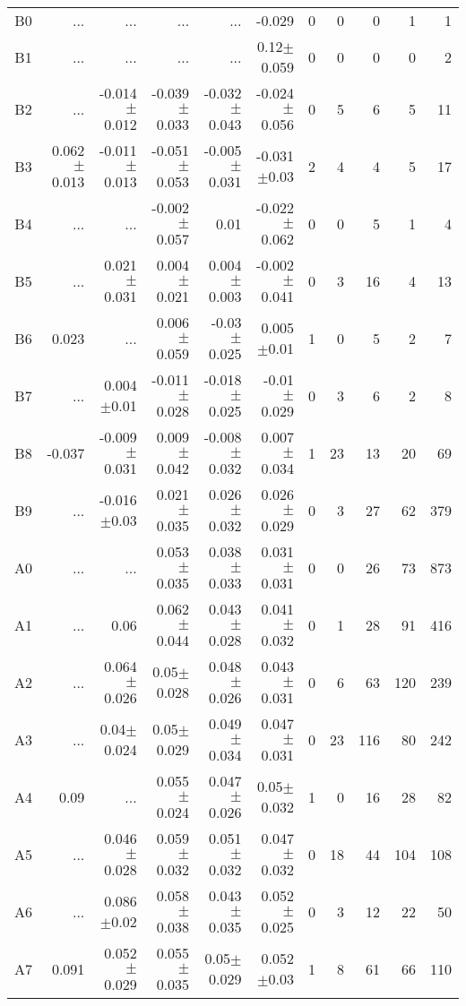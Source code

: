 \begin{table}[t]
\begin{table}[t]
\begin{center}
\begin{tabular}{c|rrrrr|rrrrr}
    B0	&	 ...	&	 ...	&	 ...	&	 ...	&	-0.029	&	0	&	0	&	0	&	1	&	1	\\
    B1	&	 ...	&	 ...	&	 ...	&	 ...	&	0.12$\pm$0.059	&	0	&	0	&	0	&	0	&	2	\\
    B2	&	 ...	&	-0.014$\pm$0.012	&	-0.039$\pm$0.033	&	-0.032$\pm$0.043	&	-0.024$\pm$0.056	&	0	&	5	&	6	&	5	&	11	\\
    B3	&	0.062$\pm$0.013	&	-0.011$\pm$0.013	&	-0.051$\pm$0.053	&	-0.005$\pm$0.031	&	-0.031$\pm$0.03	&	2	&	4	&	4	&	5	&	17	\\
    B4	&	 ...	&	 ...	&	-0.002$\pm$0.057	&	0.01	&	-0.022$\pm$0.062	&	0	&	0	&	5	&	1	&	4	\\
    B5	&	 ...	&	0.021$\pm$0.031	&	0.004$\pm$0.021	&	0.004$\pm$0.003	&	-0.002$\pm$0.041	&	0	&	3	&	16	&	4	&	13	\\
    B6	&	0.023	&	 ...	&	0.006$\pm$0.059	&	-0.03$\pm$0.025	&	0.005$\pm$0.01	&	1	&	0	&	5	&	2	&	7	\\
    B7	&	 ...	&	0.004$\pm$0.01	&	-0.011$\pm$0.028	&	-0.018$\pm$0.025	&	-0.01$\pm$0.029	&	0	&	3	&	6	&	2	&	8	\\
    B8	&	-0.037	&	-0.009$\pm$0.031	&	0.009$\pm$0.042	&	-0.008$\pm$0.032	&	0.007$\pm$0.034	&	1	&	23	&	13	&	20	&	69	\\
    B9	&	 ...	&	-0.016$\pm$0.03	&	0.021$\pm$0.035	&	0.026$\pm$0.032	&	0.026$\pm$0.029	&	0	&	3	&	27	&	62	&	379	\\
    A0	&	 ...	&	 ...	&	0.053$\pm$0.035	&	0.038$\pm$0.033	&	0.031$\pm$0.031	&	0	&	0	&	26	&	73	&	873	\\
    A1	&	 ...	&	0.06	&	0.062$\pm$0.044	&	0.043$\pm$0.028	&	0.041$\pm$0.032	&	0	&	1	&	28	&	91	&	416	\\
    A2	&	 ...	&	0.064$\pm$0.026	&	0.05$\pm$0.028	&	0.048$\pm$0.026	&	0.043$\pm$0.031	&	0	&	6	&	63	&	120	&	239	\\
    A3	&	 ...	&	0.04$\pm$0.024	&	0.05$\pm$0.029	&	0.049$\pm$0.034	&	0.047$\pm$0.031	&	0	&	23	&	116	&	80	&	242	\\
    A4	&	0.09	&	 ...	&	0.055$\pm$0.024	&	0.047$\pm$0.026	&	0.05$\pm$0.032	&	1	&	0	&	16	&	28	&	82	\\
    A5	&	 ...	&	0.046$\pm$0.028	&	0.059$\pm$0.032	&	0.051$\pm$0.032	&	0.047$\pm$0.032	&	0	&	18	&	44	&	104	&	108	\\
    A6	&	 ...	&	0.086$\pm$0.02	&	0.058$\pm$0.038	&	0.043$\pm$0.035	&	0.052$\pm$0.025	&	0	&	3	&	12	&	22	&	50	\\
    A7	&	0.091	&	0.052$\pm$0.029	&	0.055$\pm$0.035	&	0.05$\pm$0.029	&	0.052$\pm$0.03	&	1	&	8	&	61	&	66	&	110	\\

\end{tabular}
\end{center}
\end{table}
\end{table}
